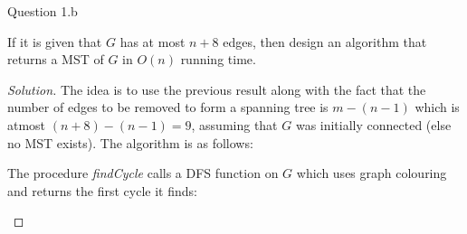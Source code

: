 \begin{solution}{Question 1.b}
    \begin{question}[]
        If it is given that $G$ has at most $n+8$ edges, then design an algorithm that returns a MST of $G$ in $O(n)$ running time.
    \end{question}
    \tcblower{}
    \begin{proof}[Solution]
        The idea is to use the previous result along with the fact that the number of edges to be removed to form a spanning tree is $m-(n-1)$ which is atmost $(n+8)-(n-1)=9$, assuming that $G$ was initially connected (else no MST exists). The algorithm is as follows:
        \begin{algorithm}[H]
            \caption{Compute MST for 1.b}\label{alg:mst}
            \begin{algorithmic}[1]
                    \EndWhile{}
                \EndProcedure{}
            \end{algorithmic}
        \end{algorithm}
        
        The procedure \textit{findCycle} calls a DFS function on $G$ which uses graph colouring and returns the first cycle it finds:
        \begin{algorithm}[H]
            \caption{$findCycle$}\label{alg:cycle}
            \begin{algorithmic}[1]
                    \EndIf{}
                    \EndWhile{}
                \EndProcedure{}
            \end{algorithmic}
        \end{algorithm}


\end{proof}
\end{solution}
